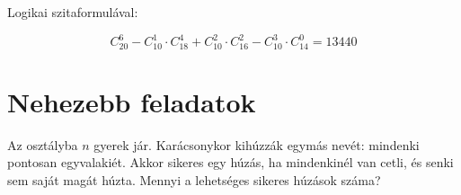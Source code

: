 \begin{solution}
Logikai szitaformulával:

\[
C_{20}^{6}-C_{10}^{1}\cdot C_{18}^{4}+C_{10}^{2}\cdot C_{16}^{2}-C_{10}^{3}\cdot C_{14}^{0}=13440
\]
\end{solution}

\section*{Nehezebb feladatok}
\begin{extraproblem}
Az osztályba $n$ gyerek jár. Karácsonykor kihúzzák egymás nevét:
mindenki pontosan egyvalakiét. Akkor sikeres egy húzás, ha mindenkinél
van cetli, és senki sem saját magát húzta. Mennyi a lehetséges sikeres
húzások száma?
\end{extraproblem}


